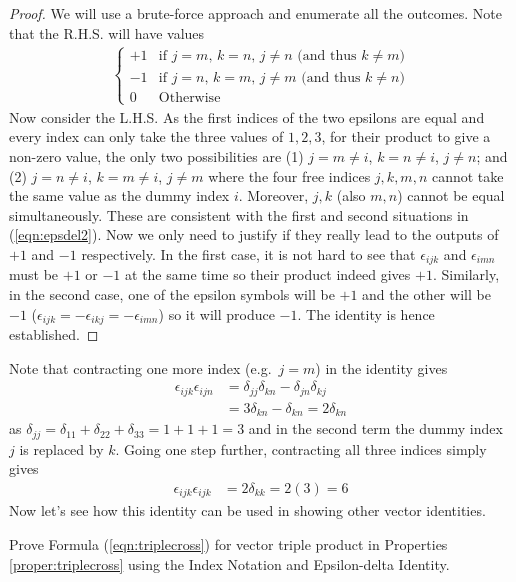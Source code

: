 \begin{proof}
We will use a brute-force approach and enumerate all the outcomes. Note that the R.H.S. will have values 
\begin{align}
\begin{cases}
+1 & \text{if $j=m$, $k=n$, $j\neq n$ (and thus $k\neq m$)} \\
-1 & \text{if $j=n$, $k=m$, $j\neq m$ (and thus $k\neq n$)} \\
0 & \text{Otherwise}
\end{cases}
\label{eqn:epsdel2}
\end{align}
Now consider the L.H.S. As the first indices of the two epsilons are equal and every index can only take the three values of $1,2,3$, for their product to give a non-zero value, the only two possibilities are (1) $j = m \neq i$, $k = n \neq i$, $j \neq n$; and (2) $j = n \neq i$, $k = m \neq i$, $j \neq m$ where the four free indices $j,k,m,n$ cannot take the same value as the dummy index $i$. Moreover, $j,k$ (also $m,n$) cannot be equal simultaneously. These are consistent with the first and second situations in (\ref{eqn:epsdel2}). Now we only need to justify if they really lead to the outputs of $+1$ and $-1$ respectively. In the first case, it is not hard to see that $\epsilon_{ijk}$ and $\epsilon_{imn}$ must be $+1$ or $-1$ at the same time so their product indeed gives $+1$. Similarly, in the second case, one of the epsilon symbols will be $+1$ and the other will be $-1$ ($\epsilon_{ijk} = -\epsilon_{ikj} = -\epsilon_{imn}$) so it will produce $-1$. The identity is hence established.
\end{proof}
Note that contracting one more index (e.g.\ $j=m$) in the identity gives
\begin{align}
\epsilon_{ijk}\epsilon_{ijn} &= \delta_{jj}\delta_{kn} - \delta_{jn}\delta_{kj} \nonumber \\
&= 3\delta_{kn} - \delta_{kn} = 2\delta_{kn}
\end{align}
as $\delta_{jj} = \delta_{11} + \delta_{22} + \delta_{33} = 1+1+1 = 3$ and in the second term the dummy index $j$ is replaced by $k$. Going one step further, contracting all three indices simply gives
\begin{align}
\epsilon_{ijk}\epsilon_{ijk} &= 2\delta_{kk} = 2(3) = 6
\end{align}
Now let's see how this identity can be used in showing other vector identities.
\begin{exmp}
Prove Formula (\ref{eqn:triplecross}) for vector triple product in Properties \ref{proper:triplecross} using the Index Notation and Epsilon-delta Identity.
\end{exmp}
